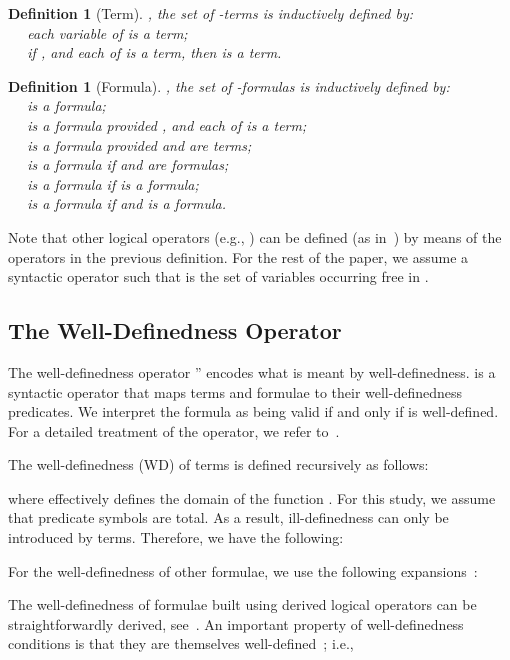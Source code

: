 \documentclass[copyright]{eptcs}
\newtheorem{definition}[theorem]{Definition}
\begin{document}
\begin{definition}[Term]
, the set of -terms is inductively defined by:\\
~~ each variable of  is a term;\\
~~ if ,  and each of  is a term, then  is a term.
\end{definition}
\begin{definition}[Formula]
, the set of -formulas is inductively defined by:\\
~~  is a formula;\\
~~  is a formula provided ,  and each of  is a term;\\
~~  is a formula provided  and  are terms;\\
~~  is a formula if  and  are formulas;\\
~~  is a formula if  is a formula;\\
~~  is a formula if  and  is a formula.
\end{definition}
Note that other logical operators (e.g., ) can be defined (as in~\cite{farhad}) by means of the operators in the previous definition. For the rest of the paper, we assume a syntactic operator  such that  is the set of variables occurring free in .

\subsection{The Well-Definedness Operator}
The well-definedness operator '' encodes what is meant by well-definedness.  is a syntactic operator that maps terms and formulae to their well-definedness predicates. We interpret the formula  as being valid if and only if  is well-defined.
For a detailed treatment of the  operator, we refer to~\cite{723108}.
\par
The well-definedness (WD) of terms is defined recursively as follows:

where  effectively defines the domain of the function . For this study, we assume that predicate symbols are total. As a result, ill-definedness can only be introduced by terms. Therefore, we have the following:

For the well-definedness of other formulae, we use the following expansions~\cite{723108}:

The well-definedness of formulae built using derived logical operators can be straightforwardly derived, see~\cite{farhad}. An important property of well-definedness conditions is that they are themselves well-defined~\cite{icfemMehta08}; i.e.,
\end{document}
